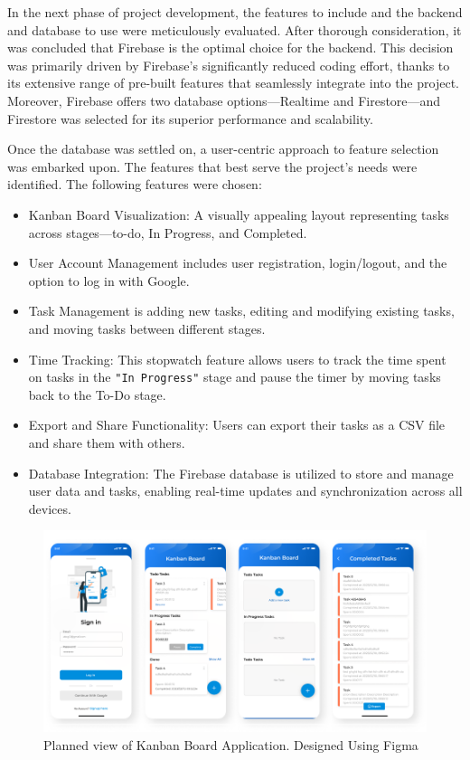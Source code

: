 In the next phase of project development, the features to include and the backend and database to use were meticulously evaluated. After thorough consideration, it was concluded that Firebase is the optimal choice for the backend. This decision was primarily driven by Firebase’s significantly reduced coding effort, thanks to its extensive range of pre-built features that seamlessly integrate into the project. Moreover, Firebase offers two database options—Realtime and Firestore—and Firestore was selected for its superior performance and scalability.
\par
Once the database was settled on, a user-centric approach to feature selection was embarked upon. The features that best serve the project’s needs were identified. The following features were chosen:
\begin{itemize}
\item	Kanban Board Visualization: A visually appealing layout representing tasks across stages—to-do, In Progress, and Completed.
\item	User Account Management includes user registration, login/logout, and the option to log in with Google.  
\item  	Task Management is adding new tasks, editing and modifying existing tasks, and moving tasks between different stages.
\item 	Time Tracking: This stopwatch feature allows users to track the time spent on tasks in the \verb|"In Progress"| stage and pause the timer by moving tasks back to the To-Do stage.
\item 	Export and Share Functionality: Users can export their tasks as a CSV file and share them with others.
\item   Database Integration: The Firebase database is utilized to store and manage user data and tasks, enabling real-time updates and synchronization across all devices.
\end{itemize}

\begin{figure}[htbp]
    \centering
    \includegraphics[scale = 0.85]{img/kanban_board.png}
    \caption{Planned view of Kanban Board Application. Designed Using Figma}
    \label{fig:kanban_board}
\end{figure}

